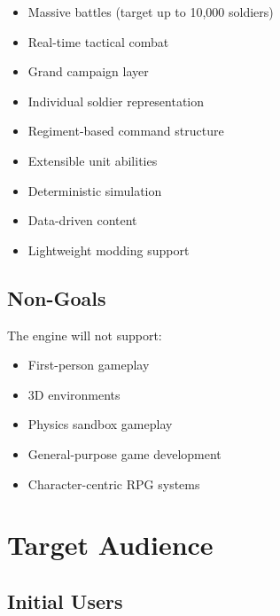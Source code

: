 \documentclass[11pt,a4paper]{article}
\begin{document}
\begin{itemize}

    \item Massive battles (target up to 10,000 soldiers)

    \item Real-time tactical combat

    \item Grand campaign layer

    \item Individual soldier representation

    \item Regiment-based command structure

    \item Extensible unit abilities

    \item Deterministic simulation

    \item Data-driven content

    \item Lightweight modding support

\end{itemize}

\subsection{Non-Goals}

The engine will not support:

\begin{itemize}

    \item First-person gameplay

    \item 3D environments

    \item Physics sandbox gameplay

    \item General-purpose game development

    \item Character-centric RPG systems

\end{itemize}

\section{Target Audience}

\subsection{Initial Users}
\end{document}
